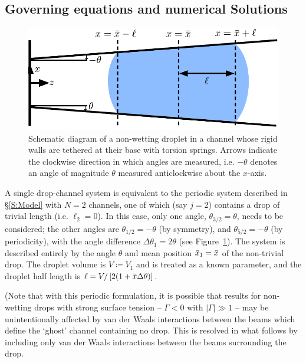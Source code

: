 \subsection{Governing equations and numerical Solutions}
\begin{figure}[t]
\centering
\includegraphics[scale=0.6]{SchematicSingleChannel_noghost.pdf}
\caption{Schematic diagram of a non-wetting droplet in a channel whose rigid walls are tethered at their base with torsion springs. Arrows indicate the clockwise direction in which angles are measured, i.e. $-\theta$ denotes an angle of magnitude $\theta$ measured anticlockwise about the $x$-axis.}\label{fig:SingleChannel:Schematic}
\end{figure}

A single drop-channel system is equivalent to the periodic system described in \S\ref{S:Model} with $N =2$ channels, one of which (say $j = 2$) contains a drop of trivial length (i.e. $\ell_2 = 0$). In this case, only one angle, $\theta_{3/2} = \theta$, needs to be considered; the other angles are $\theta_{1/2} = -\theta$ (by symmetry), and $\theta_{5/2} = -\theta$ (by periodicity), with the angle difference $\Delta \theta_{1} = 2\theta$ (see Figure~\ref{fig:SingleChannel:Schematic}). The system is described entirely by the angle $\theta$ and mean position $\bar{x}_1 = \bar{x}$ of the non-trivial drop. The droplet volume is $V\coloneqq V_1$ and is treated as a known parameter, and the droplet half length is $\ell = V/\left[2(1 + \bar{x}\Delta \theta)\right]$.

(Note that with this periodic formulation, it is possible that results for non-wetting drops with strong surface tension -- $\Gamma < 0$ with $|\Gamma| \gg 1$ -- may be unintentionally affected by van der Waals interactions between the beams which define the `ghost' channel containing no drop. This is resolved in what follows by including only van der Waals interactions between the beams surrounding the drop.



